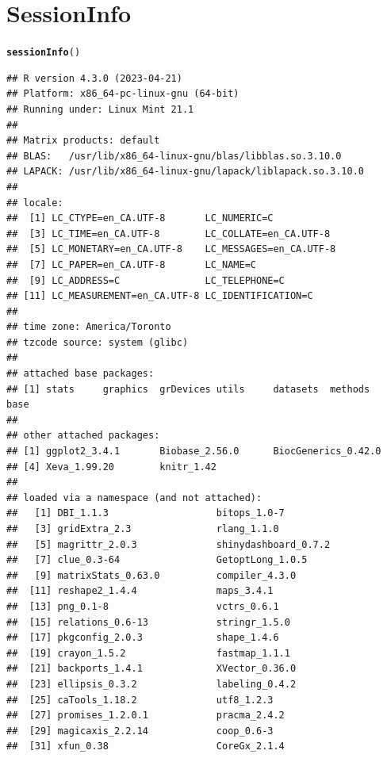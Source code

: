 \documentclass{article}\usepackage[]{graphicx}\usepackage[]{xcolor}
\makeatletter
\newcommand{\hlstd}[1]{\textcolor[rgb]{0.345,0.345,0.345}{#1}}%
\newcommand{\hlkwd}[1]{\textcolor[rgb]{0.737,0.353,0.396}{\textbf{#1}}}%
\newenvironment{kframe}{%
 \def\at@end@of@kframe{}%
 \ifinner\ifhmode%
  \def\at@end@of@kframe{\end{minipage}}%
  \begin{minipage}{\columnwidth}%
 \fi\fi%
 \def\FrameCommand##1{\hskip\@totalleftmargin \hskip-\fboxsep
 \colorbox{shadecolor}{##1}\hskip-\fboxsep
     \hskip-\linewidth \hskip-\@totalleftmargin \hskip\columnwidth}%
 \MakeFramed {\advance\hsize-\width
   \@totalleftmargin\z@ \linewidth\hsize
   \@setminipage}}%
 {\par\unskip\endMakeFramed%
 \at@end@of@kframe}
\newenvironment{knitrout}{}{} %
\makeatother
\begin{document}
\newpage
\section{SessionInfo}
\begin{knitrout}
\color{fgcolor}\begin{kframe}
\begin{alltt}
\hlkwd{sessionInfo}\hlstd{()}
\end{alltt}
\begin{verbatim}
## R version 4.3.0 (2023-04-21)
## Platform: x86_64-pc-linux-gnu (64-bit)
## Running under: Linux Mint 21.1
## 
## Matrix products: default
## BLAS:   /usr/lib/x86_64-linux-gnu/blas/libblas.so.3.10.0 
## LAPACK: /usr/lib/x86_64-linux-gnu/lapack/liblapack.so.3.10.0
## 
## locale:
##  [1] LC_CTYPE=en_CA.UTF-8       LC_NUMERIC=C              
##  [3] LC_TIME=en_CA.UTF-8        LC_COLLATE=en_CA.UTF-8    
##  [5] LC_MONETARY=en_CA.UTF-8    LC_MESSAGES=en_CA.UTF-8   
##  [7] LC_PAPER=en_CA.UTF-8       LC_NAME=C                 
##  [9] LC_ADDRESS=C               LC_TELEPHONE=C            
## [11] LC_MEASUREMENT=en_CA.UTF-8 LC_IDENTIFICATION=C       
## 
## time zone: America/Toronto
## tzcode source: system (glibc)
## 
## attached base packages:
## [1] stats     graphics  grDevices utils     datasets  methods   base     
## 
## other attached packages:
## [1] ggplot2_3.4.1       Biobase_2.56.0      BiocGenerics_0.42.0
## [4] Xeva_1.99.20        knitr_1.42         
## 
## loaded via a namespace (and not attached):
##   [1] DBI_1.1.3                   bitops_1.0-7               
##   [3] gridExtra_2.3               rlang_1.1.0                
##   [5] magrittr_2.0.3              shinydashboard_0.7.2       
##   [7] clue_0.3-64                 GetoptLong_1.0.5           
##   [9] matrixStats_0.63.0          compiler_4.3.0             
##  [11] reshape2_1.4.4              maps_3.4.1                 
##  [13] png_0.1-8                   vctrs_0.6.1                
##  [15] relations_0.6-13            stringr_1.5.0              
##  [17] pkgconfig_2.0.3             shape_1.4.6                
##  [19] crayon_1.5.2                fastmap_1.1.1              
##  [21] backports_1.4.1             XVector_0.36.0             
##  [23] ellipsis_0.3.2              labeling_0.4.2             
##  [25] caTools_1.18.2              utf8_1.2.3                 
##  [27] promises_1.2.0.1            pracma_2.4.2               
##  [29] magicaxis_2.2.14            coop_0.6-3                 
##  [31] xfun_0.38                   CoreGx_2.1.4               

\end{verbatim}
\end{kframe}
\end{knitrout}
\end{document}
